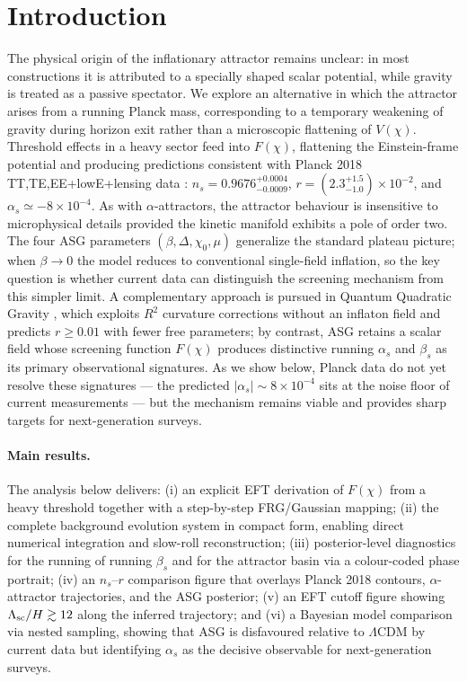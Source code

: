 \documentclass[11pt,a4paper]{article}
\begin{document}
\section{Introduction}
\label{sec:intro}
The physical origin of the inflationary attractor remains unclear: in most constructions it is attributed to a specially shaped scalar potential, while gravity is treated as a passive spectator. We explore an alternative in which the attractor arises from a running Planck mass, corresponding to a temporary weakening of gravity during horizon exit rather than a microscopic flattening of $V(\chi)$. Threshold effects in a heavy sector feed into $F(\chi)$, flattening the Einstein-frame potential and producing predictions consistent with Planck 2018 TT,TE,EE+lowE+lensing data \cite{Planck2018}: $n_s=0.9676^{+0.0004}_{-0.0009}$, $r=(2.3^{+1.5}_{-1.0})\times10^{-2}$, and $\alpha_s\simeq-8\times10^{-4}$. As with $\alpha$-attractors, the attractor behaviour is insensitive to microphysical details provided the kinetic manifold exhibits a pole of order two. The four ASG parameters $(\beta,\Delta,\chi_0,\mu)$ generalize the standard plateau picture; when $\beta\to0$ the model reduces to conventional single-field inflation, so the key question is whether current data can distinguish the screening mechanism from this simpler limit.
A complementary approach is pursued in Quantum Quadratic Gravity \cite{Liu2026}, which exploits $R^2$ curvature corrections without an inflaton field and predicts $r\ge0.01$ with fewer free parameters; by contrast, ASG retains a scalar field whose screening function $F(\chi)$ produces distinctive running $\alpha_s$ and $\beta_s$ as its primary observational signatures. As we show below, Planck data do not yet resolve these signatures --- the predicted $|\alpha_s|\sim8\times10^{-4}$ sits at the noise floor of current measurements --- but the mechanism remains viable and provides sharp targets for next-generation surveys.

\paragraph{Main results.} The analysis below delivers: (i) an explicit EFT derivation of $F(\chi)$ from a heavy threshold together with a step-by-step FRG/Gaussian mapping; (ii) the complete background evolution system in compact form, enabling direct numerical integration and slow-roll reconstruction; (iii) posterior-level diagnostics for the running of running $\beta_s$ and for the attractor basin via a colour-coded phase portrait; (iv) an $n_s$--$r$ comparison figure that overlays Planck 2018 contours, $\alpha$-attractor trajectories, and the ASG posterior; (v) an EFT cutoff figure showing $\Lambda_{\rm sc}/H \gtrsim 12$ along the inferred trajectory; and (vi) a Bayesian model comparison via nested sampling, showing that ASG is disfavoured relative to $\Lambda$CDM by current data but identifying $\alpha_s$ as the decisive observable for next-generation surveys.
\end{document}
